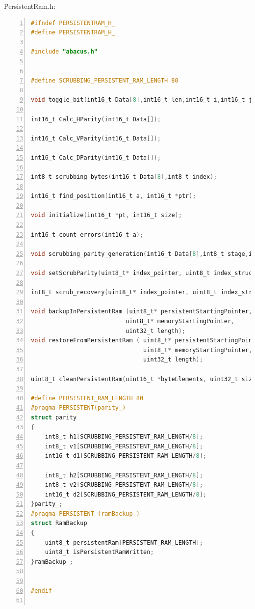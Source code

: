 \documentclass[LaM,binding=0.6cm,oneside]{../sapthesis}
\begin{document}
PersistentRam.h:
\begin{lstlisting}[language=C,
                   basicstyle=\scriptsize,
                   numbers=left,
                   stepnumber=0,
                   numbersep=4pt,
                   tabsize=2,
                   showspaces=false,
                   showstringspaces=false]
#ifndef PERSISTENTRAM_H_
#define PERSISTENTRAM_H_

#include "abacus.h"


#define SCRUBBING_PERSISTENT_RAM_LENGTH 80

void toggle_bit(int16_t Data[8],int16_t len,int16_t i,int16_t j);

int16_t Calc_HParity(int16_t Data[]);

int16_t Calc_VParity(int16_t Data[]);

int16_t Calc_DParity(int16_t Data[]);

int8_t scrubbing_bytes(int16_t Data[8],int8_t index);

int16_t find_position(int16_t a, int16_t *ptr);

void initialize(int16_t *pt, int16_t size);

int16_t count_errors(int16_t a);

void scrubbing_parity_generation(int16_t Data[8],int8_t stage,int8_t index );

void setScrubParity(uint8_t* index_pointer, uint8_t index_struct );

int8_t scrub_recovery(uint8_t* index_pointer, uint8_t index_struct );

void backupInPersistentRam (uint8_t* persistentStartingPointer,
                           uint8_t* memoryStartingPointer,
                           uint32_t length);
void restoreFromPersistentRam ( uint8_t* persistentStartingPointer,
                                uint8_t* memoryStartingPointer,
                                uint32_t length);

uint8_t cleanPersistentRam(uint16_t *byteElements, uint32_t size);

#define PERSISTENT_RAM_LENGTH 80
#pragma PERSISTENT(parity_)
struct parity
{
    int8_t h1[SCRUBBING_PERSISTENT_RAM_LENGTH/8];
    int8_t v1[SCRUBBING_PERSISTENT_RAM_LENGTH/8];
    int16_t d1[SCRUBBING_PERSISTENT_RAM_LENGTH/8];

    int8_t h2[SCRUBBING_PERSISTENT_RAM_LENGTH/8];
    int8_t v2[SCRUBBING_PERSISTENT_RAM_LENGTH/8];
    int16_t d2[SCRUBBING_PERSISTENT_RAM_LENGTH/8];
}parity_;
#pragma PERSISTENT (ramBackup_)
struct RamBackup
{
    uint8_t persistentRam[PERSISTENT_RAM_LENGTH];
    uint8_t isPersistentRamWritten;
}ramBackup_;


#endif


\end{lstlisting}
\end{document}
